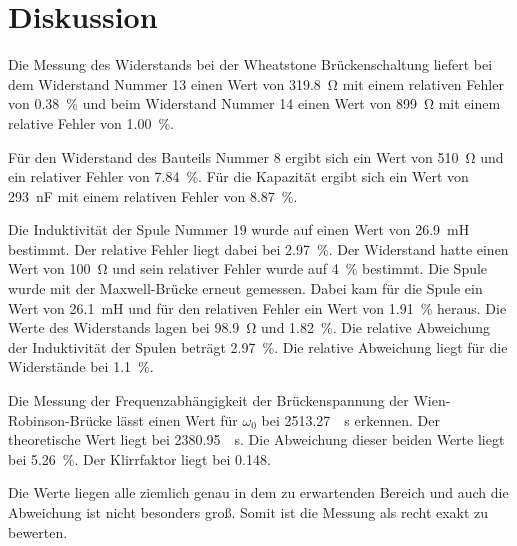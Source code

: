\section{Diskussion}
\label{sec:Diskussion}

Die Messung des Widerstands bei der Wheatstone Brückenschaltung liefert bei dem Widerstand Nummer \num{13} 
einen Wert von \SI{319.8}{\ohm} mit einem relativen Fehler von \SI{0.38}{\percent} und beim Widerstand Nummer 
\num{14} einen Wert von \SI{899}{\ohm} mit einem relative Fehler von \SI{1.00}{\percent}. 

\noindent Für den Widerstand des Bauteils Nummer \num{8} ergibt sich ein Wert von 
\SI{510}{\ohm} und ein relativer Fehler von \SI{7.84}{\percent}. Für die Kapazität ergibt sich ein Wert von \SI{293}{\nano\farad} mit einem relativen Fehler von \SI{8.87}{\percent}.

\noindent Die Induktivität der Spule Nummer \num{19} wurde auf einen Wert von \SI{26.9}{\milli\henry} bestimmt. 
Der relative Fehler liegt dabei bei \SI{2.97}{\percent}. Der Widerstand hatte einen Wert von \SI{100}{\ohm} 
und sein relativer Fehler wurde auf \SI{4}{\percent} bestimmt. 
Die Spule wurde mit der Maxwell-Brücke erneut gemessen. Dabei kam für die Spule ein Wert von \SI{26.1}{\milli\henry} 
und für den relativen Fehler ein Wert von \SI{1.91}{\percent} heraus. Die Werte des Widerstands lagen bei 
\SI{98.9}{\ohm} und \SI{1.82}{\percent}.  Die relative Abweichung der Induktivität der Spulen beträgt \SI{2.97}{\percent}. Die relative Abweichung liegt für die Widerstände bei \SI{1.1}{\percent}.

\noindent Die Messung der Frequenzabhängigkeit der Brückenspannung der Wien-Robinson-Brücke lässt einen Wert für 
$\omega_0$ bei \SI[per-mode=fraction]{2513.27}{\per\second} erkennen. Der theoretische Wert liegt bei \SI[per-mode=fraction]{2380.95}{\per\second}. Die Abweichung dieser 
beiden Werte liegt bei \SI{5.26}{\percent}. Der Klirrfaktor liegt bei \num{0.148}. 

\noindent Die Werte liegen alle ziemlich genau in dem zu erwartenden Bereich und auch die Abweichung ist nicht besonders groß. Somit ist die Messung als recht exakt zu bewerten. 
